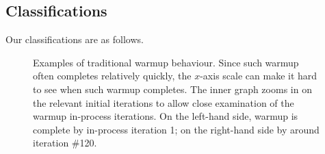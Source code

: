 \documentclass[preprint,numbers,10pt]{sigplanconf}
\begin{document}
\subsection{Classifications}

Our classifications are as follows.

\begin{figure}[tbp]
\caption{Examples of traditional warmup behaviour. Since such warmup often completes
relatively quickly, the $x$-axis scale can make it hard to see when such warmup
completes. The inner graph zooms in on the relevant initial iterations to allow
close examination of the warmup in-process iterations. On the left-hand side,
warmup is complete by in-process iteration 1; on the right-hand side by around
iteration \#120.}
\label{fig:examples:trad}
\end{figure}
\end{document}
